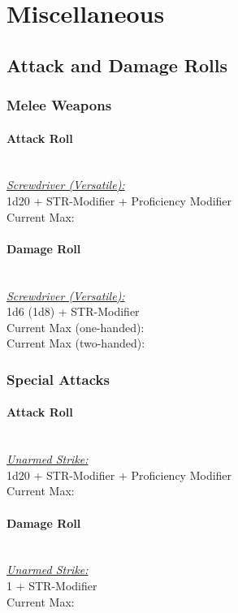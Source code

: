 {\section*{Miscellaneous}
\subsection*{Attack and Damage Rolls}
\subsubsection*{Melee Weapons}
\paragraph*{Attack Roll}\hfill\\
\underline{\textit{Screwdriver (Versatile):}}\\
1d20 + STR-Modifier + Proficiency Modifier\\
\indent Current Max: 
\paragraph*{Damage Roll}\hfill\\
\underline{\textit{Screwdriver (Versatile):}}\\
1d6 (1d8) + STR-Modifier\\
\indent Current Max (one-handed): \\
\indent Current Max (two-handed): 
\subsubsection*{Special Attacks}
\paragraph*{Attack Roll}\hfill\\
\underline{\textit{Unarmed Strike:}}\\
1d20 + STR-Modifier + Proficiency Modifier\\
\indent Current Max: 
\paragraph*{Damage Roll}\hfill\\
\underline{\textit{Unarmed Strike:}}\\
1 + STR-Modifier\\
\indent Current Max: 
}